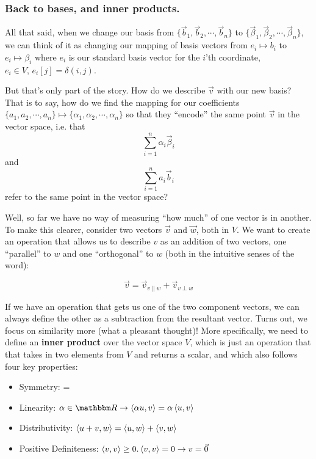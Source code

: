 \documentclass[letterpaper,12pt]{report}
\providecommand{\tightlist}{%
  \setlength{\itemsep}{0pt}\setlength{\parskip}{0pt}}
\begin{document}
\subsubsection*{Back to bases, and inner products.}

All that said, when we change our basis from
\(\{\vec{b}_1, \vec{b}_2, \cdots, \vec{b}_n\}\)
to 
\(\{\vec{\beta}_1, \vec{\beta}_2, \cdots, \vec{\beta}_n\}\),
we can think of it as changing our mapping of basis vectors from 
\(e_i \mapsto b_i\)
to
\(e_i \mapsto \beta_i\)
where \(e_i\) is our standard basis vector for the \(i\)'th coordinate, 
\(e_i \in V, \, e_i[j] = \delta(i,j)\).
\par

But that's only part of the story. How do we describe \(\vec{v}\)
with our new basis? That is to say, how do we find the mapping for our coefficients
\(\{a_1, a_2, \cdots, a_n\} \mapsto \{\alpha_1, \alpha_2, \cdots, \alpha_n\}\)
so that they ``encode'' the same point \(\vec{v}\) in the vector space, i.e. that
\[\sum_{i=1}^{n}\alpha_i\vec{\beta}_i \]
and
\[\sum_{i=1}^{n}a_i\vec{b}_i\]
refer to the same point in the vector space?\par

Well, so far we have no way of measuring ``how much'' of one vector is in another.
To make this clearer, consider two vectors \(\vec{v}\) and \(\vec{w}\), both in \(V\).
We want to create an operation that allows us to describe \(v\) as an addition of two vectors,
one ``parallel'' to \(w\) and one ``orthogonal'' to \(w\)
(both in the intuitive senses of the word):

\[\vec{v} = \vec{v}_{v\parallel w} + \vec{v}_{v\perp w}\]
 

If we have an operation that gets us one of the two component vectors, we can
always define the other as a subtraction from the resultant vector.
Turns out, we focus on similarity more (what a pleasant thought)!
More specifically, we need to 
define an \textbf{inner product} \innerprod{} over the vector space \(V\),
which is just an operation that that takes in two elements from \(V\) and returns a scalar,
and which also follows four key properties:
\begin{itemize}
  \tightlist
  \item
    Symmetry: \innerprod[u][v] = \innerprod[v][u]
  \item
    Linearity: \(\alpha \in \domain{R} 
          \rightarrow \innerprod[\alpha u][v] = \alpha \innerprod[u][v]\)
  \item
    Distributivity:
      \(\innerprod[u+v][w] = \innerprod[u][w] + \innerprod[v][w]\)
  \item
    Positive Definiteness:
      \(\innerprod[v][v] \geq 0. \innerprod[v][v] = 0 \rightarrow v = \vec{0}\)
\end{itemize}
\end{document}
